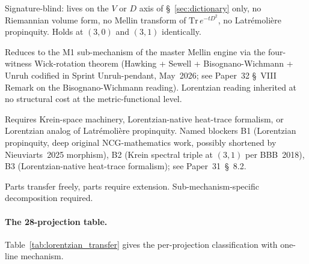 \documentclass[11pt]{article}
\begin{document}
\begin{description}
\setlength\itemsep{2pt}
\item[\textsc{transfers freely (TF)}.]  Signature-blind: lives on the
$V$ or $D$ axis of \S~\ref{sec:dictionary} only, no Riemannian volume
form, no Mellin transform of $\mathrm{Tr}\,e^{-tD^2}$, no Latr\'emoli\`ere
propinquity.  Holds at $(3, 0)$ and $(3, 1)$ identically.
\item[\textsc{wick-map free (WMF)}.]  Reduces to the M1 sub-mechanism
of the master Mellin engine via the four-witness Wick-rotation
theorem (Hawking + Sewell + Bisognano-Wichmann + Unruh codified in
Sprint Unruh-pendant, May~2026; see Paper~32 \S~VIII Remark on the
Bisognano-Wichmann reading).  Lorentzian reading inherited at no
structural cost at the metric-functional level.
\item[\textsc{euclidean specific (ES)}.]  Requires Krein-space
machinery, Lorentzian-native heat-trace formalism, or Lorentzian
analog of Latr\'emoli\`ere propinquity.  Named blockers B1
(Lorentzian propinquity, deep original NCG-mathematics
work, possibly shortened by Nieuviarts~2025 morphism), B2 (Krein
spectral triple at $(3, 1)$ per BBB~2018), B3 (Lorentzian-native
heat-trace formalism); see Paper~31~\S~8.2.
\item[\textsc{mixed (M)}.]  Parts transfer freely, parts require
extension.  Sub-mechanism-specific decomposition required.
\end{description}

\paragraph{The 28-projection table.}
Table~\ref{tab:lorentzian_transfer} gives the per-projection
classification with one-line mechanism.  
\end{document}
